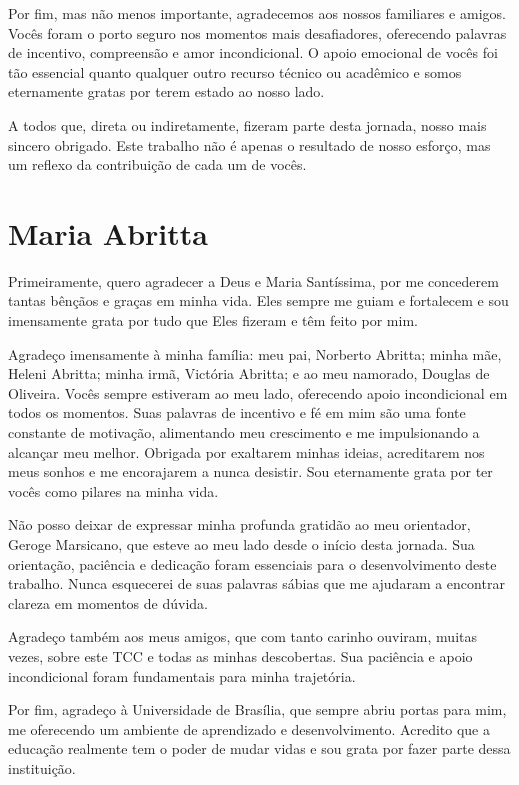 \begin{agradecimentos}
Por fim, mas não menos importante, agradecemos aos nossos familiares e amigos. Vocês foram o porto seguro nos momentos mais desafiadores, oferecendo palavras de incentivo, compreensão e amor incondicional. O apoio emocional de vocês foi tão essencial quanto qualquer outro recurso técnico ou acadêmico e somos eternamente gratas por terem estado ao nosso lado.

A todos que, direta ou indiretamente, fizeram parte desta jornada, nosso mais sincero obrigado. Este trabalho não é apenas o resultado de nosso esforço, mas um reflexo da contribuição de cada um de vocês.

\section*{Maria Abritta}

Primeiramente, quero agradecer a Deus e Maria Santíssima, por me concederem tantas bênçãos e graças em minha vida. Eles sempre me guiam e fortalecem e sou imensamente grata por tudo que Eles fizeram e têm feito por mim.

Agradeço imensamente à minha família: meu pai, Norberto Abritta; minha mãe, Heleni Abritta; minha irmã, Victória Abritta; e ao meu namorado, Douglas de Oliveira. Vocês sempre estiveram ao meu lado, oferecendo apoio incondicional em todos os momentos. Suas palavras de incentivo e fé em mim são uma fonte constante de motivação, alimentando meu crescimento e me impulsionando a alcançar meu melhor. Obrigada por exaltarem minhas ideias, acreditarem nos meus sonhos e me encorajarem a nunca desistir. Sou eternamente grata por ter vocês como pilares na minha vida.

Não posso deixar de expressar minha profunda gratidão ao meu orientador, Geroge Marsicano, que esteve ao meu lado desde o início desta jornada. Sua orientação, paciência e dedicação foram essenciais para o desenvolvimento deste trabalho. Nunca esquecerei de suas palavras sábias que me ajudaram a encontrar clareza em momentos de dúvida.

Agradeço também aos meus amigos, que com tanto carinho ouviram, muitas vezes, sobre este TCC e todas as minhas descobertas. Sua paciência e apoio incondicional foram fundamentais para minha trajetória.

Por fim, agradeço à Universidade de Brasília, que sempre abriu portas para mim, me oferecendo um ambiente de aprendizado e desenvolvimento. Acredito que a educação realmente tem o poder de mudar vidas e sou grata por fazer parte dessa instituição.


\end{agradecimentos}
